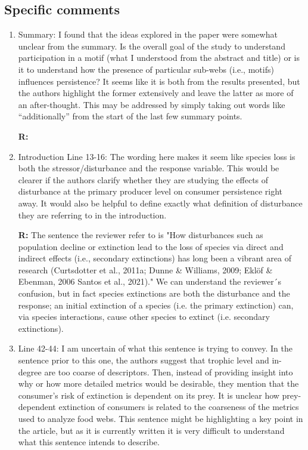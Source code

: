 \documentclass[12pt]{article}
\begin{document}
    \subsection*{Specific comments}

        \begin{enumerate}

            \item Summary: I found that the ideas explored in the paper were somewhat unclear from the summary. Is the overall goal of the study to understand participation in a motif (what I understood from the abstract and title) or is it to understand how the presence of particular sub-webs (i.e., motifs) influences persistence? It seems like it is both from the results presented, but the authors highlight the former extensively and leave the latter as more of an after-thought. This may be addressed by simply taking out words like “additionally” from the start of the last few summary points.

                \textbf{R:}

    
            \item Introduction Line 13-16: The wording here makes it seem like species loss is both the stressor/disturbance and the response variable. This would be clearer if the authors clarify whether they are studying the effects of disturbance at the primary producer level on consumer persistence right away. It would also be helpful to define exactly what definition of disturbance they are referring to in the introduction.

                \textbf{R:}
            The sentence the reviewer refer to is "How disturbances such as population decline or extinction lead to the loss of species via  direct and indirect effects (i.e., secondary extinctions) has long been a vibrant area of research (Curtsdotter et al., 2011a; Dunne & Williams, 2009; Eklöf \& Ebenman, 2006 Santos et al., 2021)." We can understand the reviewer´s confusion, but in fact species extinctions are both the disturbance and the response; an initial extinction of a species (i.e. the primary extinction) can, via species interactions, cause other species to extinct (i.e. secondary extinctions). 


            \item Line 42-44: I am uncertain of what this sentence is trying to convey. In the sentence prior to this one, the authors suggest that trophic level and in-degree are too coarse of descriptors. Then, instead of providing insight into why or how more detailed metrics would be desirable, they mention that the consumer's risk of extinction is dependent on its prey. It is unclear how prey-dependent extinction of consumers is related to the coarseness of the metrics used to analyze food webs. This sentence might be highlighting a key point in the article, but as it is currently written it is very difficult to understand what this sentence intends to describe.


\end{enumerate}
\end{document}
